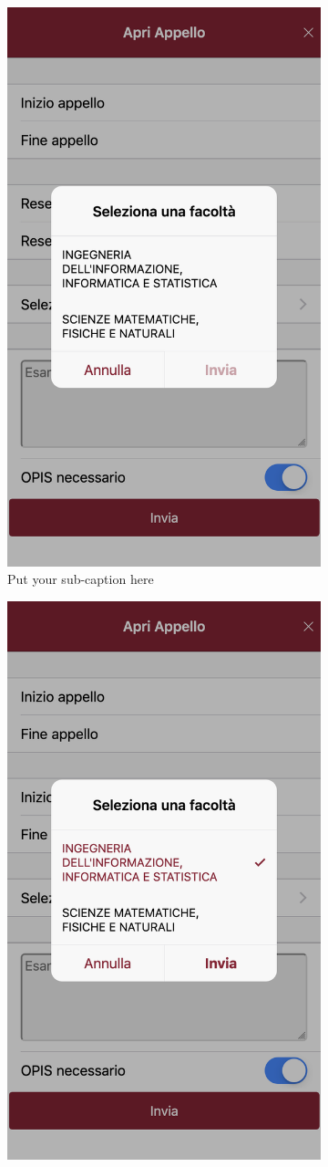 \documentclass[Lau, oneside]{sapthesis}%
\begin{document}
\begin{figure}[H]
	\begin{subfigure}{0.6\textwidth}
	  \centering
	  \includegraphics[width=0.5\linewidth]{ui-iterations/iii/facolta-1}  
	  \caption{Put your sub-caption here}
	  \label{fig:sub-first}
	\end{subfigure}
	\begin{subfigure}{0.6\textwidth}
	  \centering
	  \includegraphics[width=0.5\linewidth]{ui-iterations/iii/facolta-2}  

\end{subfigure}
\end{figure}
\end{document}

